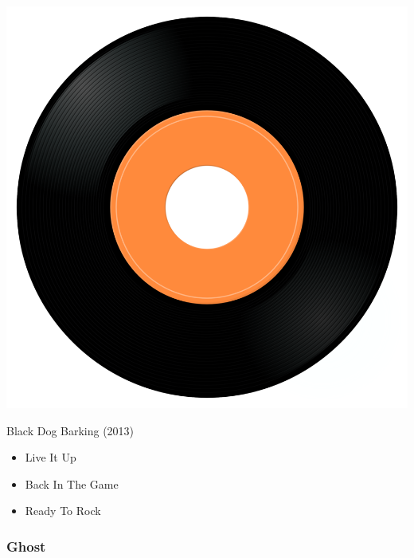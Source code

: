 \begin{minipage}[t]{0.25\textwidth}
\captionsetup{type=figure}
\includegraphics[width=\textwidth]{Images/cover.png}
\caption*{Black Dog Barking (2013)}
\end{minipage}
\begin{minipage}[t]{0.25\textwidth}\vspace{0pt}
\begin{itemize}[nosep,leftmargin=1em,labelwidth=*,align=left]
	\setlength{\itemsep}{0pt}
	\item Live It Up
	\item Back In The Game
	\item Ready To Rock
\end{itemize}
\end{minipage}

\subsubsection{Ghost}

